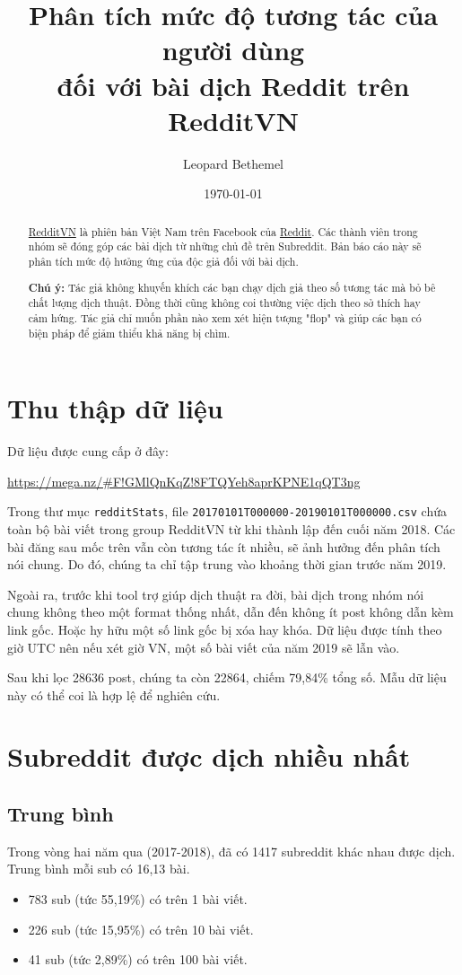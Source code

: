 \documentclass[10pt,a4paper]{article}
\author{Leopard Bethemel}
\title{Phân tích mức độ tương tác của người dùng\\đối với bài dịch Reddit trên RedditVN}
\date{\today}
\begin{document}
\maketitle
\renewcommand{\contentsname}{Mục lục}
\tableofcontents
\begin{abstract}
    \href{https://www.facebook.com/groups/redditvietnam/}{RedditVN} là phiên bản Việt Nam trên Facebook của \href{https://www.reddit.com/}{Reddit}. Các thành viên trong nhóm sẽ đóng góp các bài dịch từ những chủ đề trên Subreddit. Bản báo cáo này sẽ phân tích mức độ hưởng ứng của độc giả đối với bài dịch.

    \textbf{Chú ý:} Tác giả không khuyến khích các bạn chạy dịch giả theo số tương tác mà bỏ bê chất lượng dịch thuật. Đồng thời cũng không coi thường việc dịch theo sở thích hay cảm hứng. Tác giả chỉ muốn phần nào xem xét hiện tượng "flop" và giúp các bạn có biện pháp để giảm thiểu khả năng bị chìm.
\end{abstract}

\clearpage
\section{Thu thập dữ liệu}
Dữ liệu được cung cấp ở đây:

\href{https://mega.nz/#F!GMlQnKqZ!8FTQYeh8aprKPNE1qQT3ng}{https://mega.nz/\#F!GMlQnKqZ!8FTQYeh8aprKPNE1qQT3ng}

Trong thư mục \texttt{redditStats}, file \texttt{20170101T000000-20190101T000000.csv} chứa toàn bộ bài viết trong group RedditVN từ khi thành lập đến cuối năm 2018. Các bài đăng sau mốc trên vẫn còn tương tác ít nhiều, sẽ ảnh hưởng đến phân tích nói chung. Do đó, chúng ta chỉ tập trung vào khoảng thời gian trước năm 2019.

Ngoài ra, trước khi tool trợ giúp dịch thuật ra đời, bài dịch trong nhóm nói chung không theo một format thống nhất, dẫn đến không ít post không dẫn kèm link gốc. Hoặc hy hữu một số link gốc bị xóa hay khóa. Dữ liệu được tính theo giờ UTC nên nếu xét giờ VN, một số bài viết của năm 2019 sẽ lẫn vào.

Sau khi lọc 28636 post, chúng ta còn 22864, chiếm 79,84\% tổng số. Mẫu dữ liệu này có thể coi là hợp lệ để nghiên cứu.

\section{Subreddit được dịch nhiều nhất}
\subsection{Trung bình}
Trong vòng hai năm qua (2017-2018), đã có 1417 subreddit khác nhau được dịch. Trung bình mỗi sub có 16,13 bài.
\begin{itemize}
    \item 783 sub (tức 55,19\%) có trên 1 bài viết.
    \item 226 sub (tức 15,95\%) có trên 10 bài viết.
    \item 41 sub (tức 2,89\%) có trên 100 bài viết.
\end{itemize}
\end{document}
